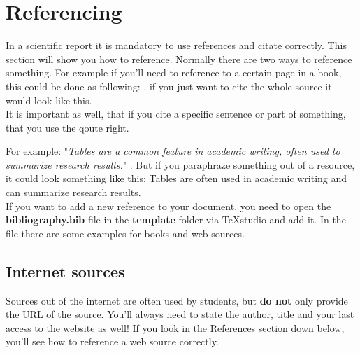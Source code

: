 \documentclass[]{article}
\begin{document}
\section{Referencing}
In a scientific report it is mandatory to use references and citate correctly. This section will show you how to reference. Normally there are two ways to reference something. For example if you'll need to reference to a certain page in a book, this could be done as following: \cite[p.233]{zigbee}, if you just want to cite the whole source it would look like this.~\cite{sharelatex} \\

It is important as well, that if you cite a specific sentence or part of something, that you use the qoute right. 

For example: "\textit{Tables are a common feature in academic writing, often used to summarize research results.}" \cite{tables}. But if you paraphraze something out of a resource, it could look something like this: Tables are often used in academic writing and can summarize research results.~\cite{tables} \\

If you want to add a new reference to your document, you need to open the \textbf{bibliography.bib} file in the \textbf{template} folder via TeXstudio and add it. In the file there are some examples for books and web sources. 

\subsection{Internet sources}
Sources out of the internet are often used by students, but \textbf{do not} only provide the URL of the source. You'll always need to state the author, title and your last access to the website as well! If you look in the References section down below, you'll see how to reference a web source correctly. 


\printbibliography
\end{document}
